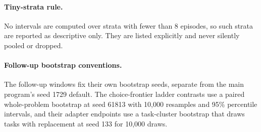 \paragraph{Tiny-strata rule.}
No intervals are computed over strata with fewer than 8 episodes, so such strata are reported as descriptive only. They are listed explicitly and never silently pooled or dropped.


\paragraph{Follow-up bootstrap conventions.}
The follow-up windows fix their own bootstrap seeds, separate from the main program's seed 1729 default. The choice-frontier ladder contrasts use a paired whole-problem bootstrap at seed 61813 with 10,000 resamples and 95\% percentile intervals, and their adapter endpoints use a task-cluster bootstrap that draws tasks with replacement at seed 133 for 10,000 draws.

